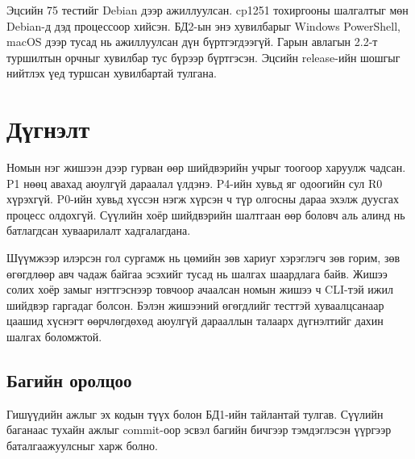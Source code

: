  Эцсийн 75 тестийг Debian дээр ажиллуулсан. cp1251 тохиргооны шалгалтыг мөн Debian-д дэд процессоор хийсэн. БД2-ын энэ хувилбарыг Windows PowerShell, macOS дээр тусад нь ажиллуулсан дүн бүртгэгдээгүй. Гарын авлагын 2.2-т туршилтын орчныг хувилбар тус бүрээр бүртгэсэн. Эцсийн release-ийн шошгыг нийтлэх үед туршсан хувилбартай тулгана.
\newpage
\section{Дүгнэлт}
Номын нэг жишээн дээр гурван өөр шийдвэрийн учрыг тоогоор харуулж чадсан. P1 нөөц авахад аюулгүй дараалал үлдэнэ. P4-ийн хувьд яг одоогийн сул R0 хүрэхгүй. P0-ийн хувьд хүссэн нэгж хүрсэн ч түр олгосны дараа эхэлж дуусгах процесс олдохгүй. Сүүлийн хоёр шийдвэрийн шалтгаан өөр боловч аль алинд нь батлагдсан хуваарилалт хадгалагдана.

Шүүмжээр илэрсэн гол сургамж нь цөмийн зөв хариуг хэрэглэгч зөв горим, зөв өгөгдлөөр авч чадаж байгаа эсэхийг тусад нь шалгах шаардлага байв. Жишээ солих хоёр замыг нэгтгэснээр товчоор ачаалсан номын жишээ ч CLI-тэй ижил шийдвэр гаргадаг болсон. Бэлэн жишээний өгөгдлийг тесттэй хуваалцсанаар цаашид хүснэгт өөрчлөгдөхөд аюулгүй дарааллын талаарх дүгнэлтийг дахин шалгах боломжтой.

\subsection*{Багийн оролцоо}
Гишүүдийн ажлыг эх кодын түүх болон БД1-ийн тайлантай тулгав. Сүүлийн баганаас тухайн ажлыг commit-оор эсвэл багийн бичгээр тэмдэглэсэн үүргээр баталгаажуулсныг харж болно.


